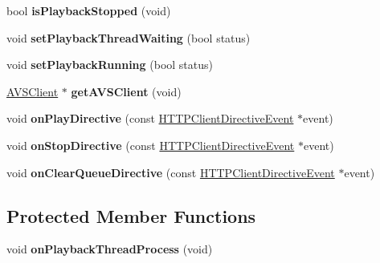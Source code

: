 \begin{DoxyCompactItemize}
\mbox{\label{classAVSPlaybackController_acd40f730cd897677de1716cd82eeebad}} 
bool {\bfseries is\+Playback\+Stopped} (void)
\item 
\mbox{\label{classAVSPlaybackController_aa6aff2a0fcf8a2930810b70d4a032cfe}} 
void {\bfseries set\+Playback\+Thread\+Waiting} (bool status)
\item 
\mbox{\label{classAVSPlaybackController_afb04cbe2676018f76426894a1ce52e90}} 
void {\bfseries set\+Playback\+Running} (bool status)
\item 
\mbox{\label{classAVSPlaybackController_a3c5d3634ab38a555881b934c52f8457b}} 
\hyperlink{classAVSClient}{A\+V\+S\+Client} $\ast$ {\bfseries get\+A\+V\+S\+Client} (void)
\item 
\mbox{\label{classAVSPlaybackController_a8a33a369f297511674e9077a1814d0a3}} 
void {\bfseries on\+Play\+Directive} (const \hyperlink{classNetwork_1_1HTTP_1_1HTTPClientDirectiveEvent}{H\+T\+T\+P\+Client\+Directive\+Event} $\ast$event)
\item 
\mbox{\label{classAVSPlaybackController_ab2f511937bf5b2352878e6f9bdc4588b}} 
void {\bfseries on\+Stop\+Directive} (const \hyperlink{classNetwork_1_1HTTP_1_1HTTPClientDirectiveEvent}{H\+T\+T\+P\+Client\+Directive\+Event} $\ast$event)
\item 
\mbox{\label{classAVSPlaybackController_a951cfdf2c8b4143b81399d9a6b6cccb7}} 
void {\bfseries on\+Clear\+Queue\+Directive} (const \hyperlink{classNetwork_1_1HTTP_1_1HTTPClientDirectiveEvent}{H\+T\+T\+P\+Client\+Directive\+Event} $\ast$event)
\end{DoxyCompactItemize}
\subsection*{Protected Member Functions}
\begin{DoxyCompactItemize}
\item 
\mbox{\label{classAVSPlaybackController_af80bfc9964761eab96ebaf5027c9a193}} 
void {\bfseries on\+Playback\+Thread\+Process} (void)
\end{DoxyCompactItemize}
